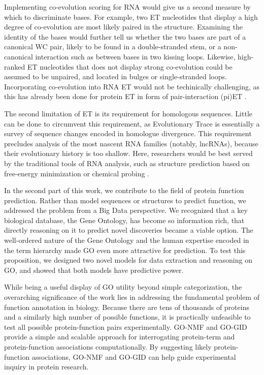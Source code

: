 \documentclass[12pt,a4paper]{report}
\begin{document}
{{Implementing co-evolution scoring for RNA would give us a second measure by which to discriminate bases. For example, two ET nucleotides that display a high degree of co-evolution are most likely paired in the structure. Examining the identity of the bases would further tell us whether the two bases are part of a canonical WC pair, likely to be found in a double-stranded stem, or a non-canonical interaction such as between bases in two kissing loops. Likewise, high-ranked ET nucleotides that does not display strong co-evolution could be assumed to be unpaired, and located in bulges or single-stranded loops. Incorporating co-evolution into RNA ET would not be techinically challenging, as this has already been done for protein ET in form of pair-interaction (pi)ET \cite{Wilkins2013}.

The second limitation of ET is its requirement for homologous sequences. Little can be done to circumvent this requirement, as Evolutionary Trace is essentially a survey of sequence changes encoded in homologue divergence. This requirement precludes analysis of the most nascent RNA families (notably, lncRNAs), because their evolutionary history is too shallow. Here, researchers would be best served by the traditional tools of RNA analysis, such as structure prediction based on free-energy minimization or chemical probing \cite{cao2011}.

In the second part of this work, we contribute to the field of protein function prediction. Rather than model sequences or structures to predict function, we addressed the problem from a Big Data perspective. We recognized that a key biological database, the Gene Ontology, has become so information rich, that directly reasoning on it to predict novel discoveries became a viable option. The well-ordered nature of the Gene Ontology and the human expertise encoded in the term hierarchy made GO even more attractive for prediction. To test this proposition, we designed two novel models for data extraction and reasoning on GO, and showed that both models have predictive power.

While being a useful display of GO utility beyond simple categorization, the overarching significance of the work lies in addressing the fundamental problem of function annotation in biology. Because there are tens of thousands of proteins and a similarly high number of possible functions, it is practically unfeasible to test all possible protein-function pairs experimentally. GO-NMF and GO-GID provide a simple and scalable approach for interrogating protein-term and protein-function associations computationally. By suggesting likely protein-function associations, GO-NMF and GO-GID can help guide experimental inquiry in protein research.

}}
\end{document}
